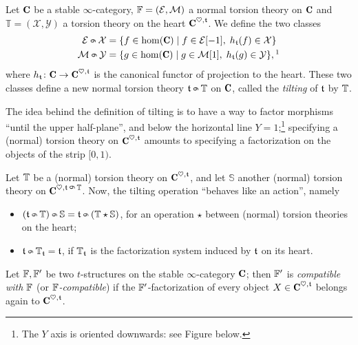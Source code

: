 \documentclass[a4paper,12pt]{amsart}
\begin{document}
\begin{definition}
Let $\C$ be a stable $\infty$\hyp{}category, $\mathbb{F} = (\mathcal{E}, \mathcal{M})$ a normal torsion theory on $\C$ and $\mathbb{T} = (\mathcal{X}, \mathcal{Y})$ a torsion theory on the heart $\C^{\heart, \tee}$. We define the two classes
\begin{align}
\E \tilt \mathcal{X} &= \{f\in \hom(\C)\mid f\in \E [-1],\; h_\tee(f)\in \mathcal{X}\}\notag\\
\M \tilt \mathcal{Y} &= \{g\in \hom(\C)\mid g\in \M [1], \; h_\tee(g)\in \mathcal{Y}\},\footnotemark
\end{align}
where $h_\tee\colon \C \to \C^{\heart,\tee}$ is the canonical functor of projection to the heart. These two classes define a new normal torsion theory $\tee \tilt \mathbb{T}$ on $\C$, called the \emph{tilting} of $\mathfrak{t}$ by $\mathbb{T}$.
\end{definition}
\begin{remark}
The idea behind the definition of tilting is to have a way to factor morphisms ``until the upper half\hyp{}plane'', and below the horizontal line $Y=1$;\footnote{The $Y$ axis is oriented downwards: see Figure  below.} specifying a (normal) torsion theory on $\C^{\heart, \tee}$ amounts to specifying a factorization on the objects of the strip $[0,1)$.
\end{remark}
\begin{proposition}
Let $\mathbb{T}$ be a (normal) torsion theory on $\C^{\heart,\tee}$, and let $\mathbb{S}$ another (normal) torsion theory on $\C^{\heart, \tee\;\tilt\; \bT}$.  Now, the tilting operation ``behaves like an action'', namely
\begin{itemize}
\item $(\tee\tilt \bT)\tilt \mathbb{S} = \tee \tilt (\bT \star \mathbb{S})$, for an operation $\star$ between (normal) torsion theories on the heart; 
\item $\tee \tilt \bT_{\tee} = \tee$, if $\mathbb{T}_{\mathfrak{t}}$ is the factorization system induced by $\mathfrak{t}$ on its heart.
\end{itemize}
\end{proposition}
\begin{definition}
Let $\mathbb{F}, \mathbb{F}'$ be two $t$\hyp{}structures on the stable $\infty$\hyp{}category $\C$; then $\mathbb{F}'$ is \emph{compatible with $\mathbb{F}$} (or \emph{$\mathbb{F}$\hyp{}compatible}) if the $\mathbb{F}'$\hyp{}factorization of every object $X\in\C^{\heart,\tee}$ belongs again to $\C^{\heart,\tee}$.
\end{definition}
\end{document}
